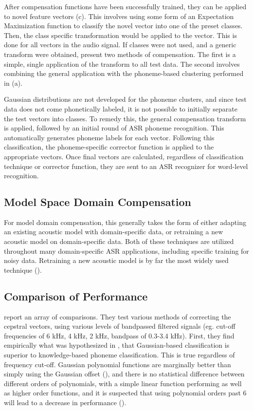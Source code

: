 After compensation functions have been successfully trained, they can be applied to novel feature vectors (c).  This involves using some form of an Expectation Maximization function to classify the novel vector into one of the preset classes.  Then, the class specific transformation would be applied to the vector.  This is done for all vectors in the audio signal.  If classes were not used, and a generic transform were obtained, \cite{morales:09} present two methods of compensation.  The first is a simple, single application of the transform to all test data.  The second involves combining the general application with the phoneme-based clustering performed in (a).  

Gaussian distributions are not developed for the phoneme clusters, and since test data does not come phonetically labeled, it is not possible to initially separate the test vectors into classes.  To remedy this, the general compensation transform is applied, followed by an initial round of ASR phoneme recognition.  This automatically generates phoneme labels for each vector.  Following this classification, the phoneme-specific corrector function is applied to the appropriate vectors.  Once final vectors are calculated, regardless of classification technique or corrector function, they are sent to an ASR recognizer for word-level recognition.


\subsection{Model Space Domain Compensation}\label{sec:mod-space-comp}

For model domain compensation, this generally takes the form of either adapting an existing acoustic model with domain-specific data, or retraining a new acoustic model on domain-specific data.  Both of these techniques are utilized throughout many domain-specific ASR applications, including specific training for noisy data.  Retraining a new acoustic model is by far the most widely used technique (\cite{morales:09}).

\subsection{Comparison of Performance}

\cite{morales:09} report an array of comparisons.  They test various methods of correcting the cepstral vectors, using various levels of bandpassed filtered signals (eg. cut-off frequencies of 6 kHz, 4 kHz, 2 kHz, bandpass of 0.3-3.4 kHz).  First, they find empirically what was hypothesized in \cite{morales:05b}, that Gaussian-based classification is superior to knowledge-based phoneme classification.  This is true regardless of frequency cut-off.  Gaussian polynomial functions are marginally better than simply using the Gaussian offset (\cite{morales:05b}), and there is no statistical difference between different orders of polynomials, with a simple linear function performing as well as higher order functions, and it is suspected that using polynomial orders past 6 will lead to a decrease in performance (\cite{morales:09}).


